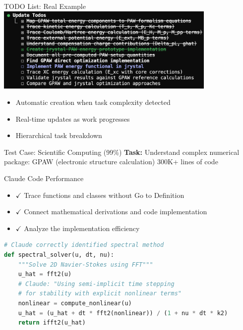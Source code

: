 \documentclass[aspectratio=169]{beamer}
\begin{document}
\begin{frame}{TODO List: Real Example}
	\includegraphics[width=0.8\textwidth]{fig/TODO2.jpg}
	
	\begin{itemize}
		\item {\color{highlight}Automatic creation} when task complexity detected
		\item {\color{highlight}Real-time updates} as work progresses
		\item {\color{highlight}Hierarchical} task breakdown
	\end{itemize}
\end{frame}

\begin{frame}[fragile]{Test Case: Scientific Computing (99\%)}
	\textbf{Task:} Understand complex numerical package: GPAW (electronic structure calculation) 300K+ lines of code
	
	\begin{block}{Claude Code Performance}
		\begin{itemize}
			\item $\checkmark$ Trace functions and classes without Go to Definition
			\item $\checkmark$ Connect mathematical derivations and code implementation
			\item $\checkmark$ Analyze the implementation efficiency
		\end{itemize}
	\end{block}
	
	\begin{lstlisting}[language=python, basicstyle=\tiny]
# Claude correctly identified spectral method
def spectral_solver(u, dt, nu):
    """Solve 2D Navier-Stokes using FFT"""
    u_hat = fft2(u)
    # Claude: "Using semi-implicit time stepping 
    # for stability with explicit nonlinear terms"
    nonlinear = compute_nonlinear(u)
    u_hat = (u_hat + dt * fft2(nonlinear)) / (1 + nu * dt * k2)
    return ifft2(u_hat)
	\end{lstlisting}
\end{frame}
\end{document}
